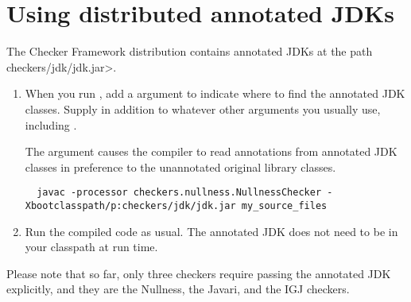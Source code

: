 
\section{Using distributed annotated JDKs\label{skeleton-using}\label{skeleton}}

The Checker Framework distribution contains
annotated JDKs at the path \<checkers/jdk/jdk.jar>.



\begin{enumerate}

\item
  When you run , add a  argument to indicate
  where to find the annotated JDK classes.
  Supply  in addition to whatever other arguments you
  usually use, including .

  The  argument causes the compiler to read annotations
  from annotated JDK classes in preference to the unannotated original
  library classes.

\begin{smaller}
\begin{Verbatim}
  javac -processor checkers.nullness.NullnessChecker -Xbootclasspath/p:checkers/jdk/jdk.jar my_source_files
\end{Verbatim}
\end{smaller}

\item
  Run the compiled code as usual.  The annotated JDK does not need to be
  in your classpath at run time.

\end{enumerate}

Please note that so far, only three checkers require passing the annotated JDK
explicitly, and they are the Nullness, the Javari, and the IGJ checkers.

